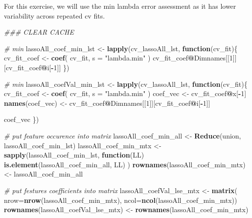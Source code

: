 \documentclass[
]{book}
\newenvironment{Shaded}{\begin{snugshade}}{\end{snugshade}}
\newcommand{\CommentTok}[1]{\textcolor[rgb]{0.56,0.35,0.01}{\textit{#1}}}
\newcommand{\ControlFlowTok}[1]{\textcolor[rgb]{0.13,0.29,0.53}{\textbf{#1}}}
\newcommand{\DataTypeTok}[1]{\textcolor[rgb]{0.13,0.29,0.53}{#1}}
\newcommand{\DecValTok}[1]{\textcolor[rgb]{0.00,0.00,0.81}{#1}}
\newcommand{\KeywordTok}[1]{\textcolor[rgb]{0.13,0.29,0.53}{\textbf{#1}}}
\newcommand{\NormalTok}[1]{#1}
\newcommand{\OperatorTok}[1]{\textcolor[rgb]{0.81,0.36,0.00}{\textbf{#1}}}
\newcommand{\StringTok}[1]{\textcolor[rgb]{0.31,0.60,0.02}{#1}}
\begin{document}
For this exercise, we will use the min lambda error assessment as it has
lower variability across repeated cv fits.

\begin{Shaded}
\begin{Highlighting}[]
\CommentTok{\#\#\# CLEAR CACHE}


\CommentTok{\# min}
\NormalTok{lassoAll\_coef\_min\_lst <{-}}\StringTok{ }\KeywordTok{lapply}\NormalTok{(cv\_lassoAll\_lst, }\ControlFlowTok{function}\NormalTok{(cv\_fit)\{}
\NormalTok{ cv\_fit\_coef <{-}}\StringTok{ }\KeywordTok{coef}\NormalTok{(}
\NormalTok{ cv\_fit,}
 \DataTypeTok{s =} \StringTok{"lambda.min"}
\NormalTok{ )}
\NormalTok{ cv\_fit\_coef}\OperatorTok{@}\NormalTok{Dimnames[[}\DecValTok{1}\NormalTok{]][cv\_fit\_coef}\OperatorTok{@}\NormalTok{i[}\OperatorTok{{-}}\DecValTok{1}\NormalTok{]]}
\NormalTok{ \})}



\CommentTok{\# min}
\NormalTok{lassoAll\_coefVal\_min\_lst <{-}}\StringTok{ }\KeywordTok{lapply}\NormalTok{(cv\_lassoAll\_lst, }\ControlFlowTok{function}\NormalTok{(cv\_fit)\{}
\NormalTok{ cv\_fit\_coef <{-}}\StringTok{ }\KeywordTok{coef}\NormalTok{(}
\NormalTok{ cv\_fit,}
 \DataTypeTok{s =} \StringTok{"lambda.min"}
\NormalTok{ )}
\NormalTok{ coef\_vec <{-}}\StringTok{ }\NormalTok{cv\_fit\_coef}\OperatorTok{@}\NormalTok{x[}\OperatorTok{{-}}\DecValTok{1}\NormalTok{]}
 \KeywordTok{names}\NormalTok{(coef\_vec) <{-}}\StringTok{  }\NormalTok{cv\_fit\_coef}\OperatorTok{@}\NormalTok{Dimnames[[}\DecValTok{1}\NormalTok{]][cv\_fit\_coef}\OperatorTok{@}\NormalTok{i[}\OperatorTok{{-}}\DecValTok{1}\NormalTok{]]}

\NormalTok{ coef\_vec}
\NormalTok{ \})}



\CommentTok{\# put feature occurence into matrix}
\NormalTok{lassoAll\_coef\_min\_all <{-}}\StringTok{ }\KeywordTok{Reduce}\NormalTok{(union, lassoAll\_coef\_min\_lst)}
\NormalTok{lassoAll\_coef\_min\_mtx <{-}}\StringTok{ }\KeywordTok{sapply}\NormalTok{(lassoAll\_coef\_min\_lst, }
  \ControlFlowTok{function}\NormalTok{(LL) }\KeywordTok{is.element}\NormalTok{(lassoAll\_coef\_min\_all, LL)}
\NormalTok{)}
\KeywordTok{rownames}\NormalTok{(lassoAll\_coef\_min\_mtx) <{-}}\StringTok{ }\NormalTok{lassoAll\_coef\_min\_all}

\CommentTok{\# put festures coefficients into matrix}
\NormalTok{lassoAll\_coefVal\_lse\_mtx <{-}}\StringTok{ }\KeywordTok{matrix}\NormalTok{(}
 \DataTypeTok{nrow=}\KeywordTok{nrow}\NormalTok{(lassoAll\_coef\_min\_mtx), }
 \DataTypeTok{ncol=}\KeywordTok{ncol}\NormalTok{(lassoAll\_coef\_min\_mtx))}
\KeywordTok{rownames}\NormalTok{(lassoAll\_coefVal\_lse\_mtx) <{-}}\StringTok{ }\KeywordTok{rownames}\NormalTok{(lassoAll\_coef\_min\_mtx)}


\end{Highlighting}
\end{Shaded}
\end{document}
